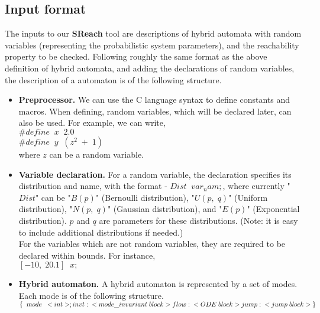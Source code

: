 \documentclass[runningheads,a4paper]{llncs}
\begin{document}
\subsection{Input format}
The inputs to our {\bf SReach} tool are descriptions of hybrid automata with random variables (representing the probabilistic system parameters), and the reachability property to be checked. Following roughly the same format as the above definition of hybrid automata, and adding the declarations of random variables, the description of a automaton is of the following structure.
\begin{itemize}
\item {\bf Preprocessor.} We can use the C language syntax to define constants and macros. When defining, random variables, which will be declared later, can also be used. For example, we can write,\\

$\#define\;\; x \;\;2.0$\\
$\#define\;\; y\;\; (z^2 \;+\; 1)$\\

where $z$ can be a random variable.\\

\item {\bf Variable declaration.} For a random variable, the declaration specifies its distribution and name, with the format - $Dist \; \; var_nam;$, where currently "$Dist$" can be "$B(p)$" (Bernoulli distribution), "$U(p, \;q)$" (Uniform distribution), "$N(p, \;q)$" (Gaussian distribution), and "$E(p)$" (Exponential distribution). $p$ and $q$ are parameters for these distributions. (Note: it is easy to include additional distributions if needed.)\\
For the variables which are not random variables, they are required to be declared within bounds. For instance,\\
$[-10, \; 20.1]\; \;  x;$\\

\item {\bf Hybrid automaton.} A hybrid automaton is represented by a set of modes. Each mode is of the following structure.\\

$
\{\;\; mode \;\; <int>;\\
invt: \;\; <mode\_invariant\; block>\\
flow: \;\; <ODE\; block>\\
jump: \;\; <jump\;block>\\
\}
$\\


\end{itemize}
\end{document}
